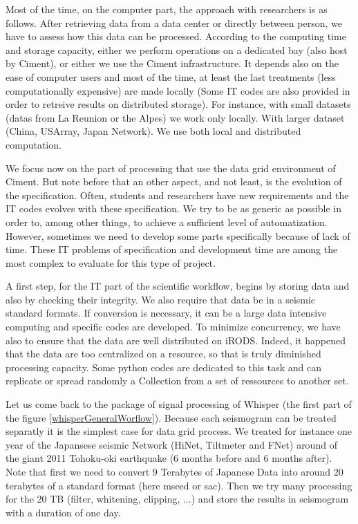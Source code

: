 \documentclass[a4paper, 10pt]{article}
\begin{document}
\begin{multicols}{2}
Most of the time, on the computer part, the approach with researchers is as follows.
After retrieving data from a data center or directly between person, we have to assess how this data can be processed.
According to the computing time and storage capacity, either we perform operations on a dedicated bay (also host by Ciment), or either we use the Ciment infrastructure.
It depends also on the ease of computer users and most of the time, at least the last treatments (less computationally expensive) are made locally
(Some IT codes are also provided in order to retreive results on distributed storage).
For instance, with small datasets (datas from La Reunion or the Alpes) we work only locally. With larger dataset (China, USArray, Japan Network).
We use both local and distributed computation.




We focus now on the part of processing that use the data grid environment of Ciment.
But note before that an other aspect, and not least, is the evolution of the specification. 
Often, students and researchers have new requirements and the IT codes evolves with these specification.
We try to be as generic as possible in order to, among other things, to achieve a sufficient level of automatization.
However, sometimes we need to develop some parts specifically because of lack of time.
These IT problems of specification and development time are among the most complex to evaluate for this type of project.


A first step, for the IT part of the scientific workflow, begins by storing data and also by checking their integrity.
We also require that data be in a seismic standard formats.
If conversion is necessary, it can be a large data intensive computing and specific codes are developed.
To minimize concurrency, we have also to ensure that the data are well distributed on iRODS. 
Indeed, it happened that the data are too centralized on a resource, so that is truly diminished processing capacity.
Some python codes are dedicated to this task and can replicate or spread randomly a Collection from a set of ressources to another set.


Let us come back to the package of signal processing of Whisper (the first part of the figure \ref{whisperGeneralWorflow}).
Because each seismogram can be treated separatly it is the simplest case for data grid process. We treated for instance one year of the
Japansese seismic Network (HiNet, Tiltmeter and FNet) around of the giant 2011 Tohoku-oki earthquake (6 months before and 6 months after).
Note that first we need to convert 9 Terabytes of Japanese Data into around 20 terabytes of a standard format (here mseed or sac).
Then we try many processing for the 20 TB (filter, whitening, clipping, ...) and store the results in seismogram with a duration of one day.



\end{multicols}
\end{document}
